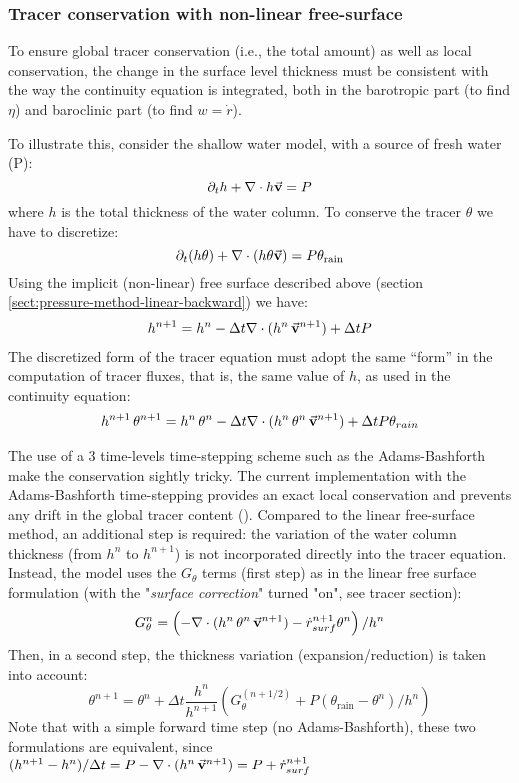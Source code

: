 \subsubsection{Tracer conservation with non-linear free-surface}
\label{sect:freesurf-tracer-advection}

To ensure global tracer conservation (i.e., the total amount) as well
as local conservation, the change in the surface level thickness must
be consistent with the way the continuity equation is integrated, both
in the barotropic part (to find $\eta$) and baroclinic part (to find
$w = \dot{r}$).

To illustrate this, consider the shallow water model, with a source
of fresh water (P):
$$
\partial_t h + \nabla \cdot h \vec{\bf v} = P
$$
where $h$ is the total thickness of the water column.
To conserve the tracer $\theta$ we have to discretize:
$$
\partial_t (h \theta) + \nabla \cdot ( h \theta \vec{\bf v})
  = P \theta_{\mathrm{rain}}
$$
Using the implicit (non-linear) free surface described above (section
\ref{sect:pressure-method-linear-backward}) we have:
\begin{eqnarray*}
h^{n+1} = h^{n} - \Delta t \nabla \cdot (h^n \, \vec{\bf v}^{n+1} ) + \Delta t P \\
\end{eqnarray*}
The discretized form of the tracer equation must adopt the same
``form'' in the computation of tracer fluxes, that is, the same value
of $h$, as used in the continuity equation:
\begin{eqnarray*}
h^{n+1} \, \theta^{n+1} = h^n \, \theta^n 
        - \Delta t \nabla \cdot (h^n \, \theta^n \, \vec{\bf v}^{n+1})
        + \Delta t P \theta_{rain}
\end{eqnarray*}

The use of a 3 time-levels time-stepping scheme such as the Adams-Bashforth
make the conservation sightly tricky.
The current implementation with the Adams-Bashforth time-stepping
provides an exact local conservation and prevents any drift in
the global tracer content (\cite{campin:02}).
Compared to the linear free-surface method, an additional step is required:
the variation of the water column thickness (from $h^n$ to $h^{n+1}$) is
not incorporated directly into the tracer equation.  Instead, the
model uses the $G_\theta$ terms (first step) as in the linear free
surface formulation (with the "{\it surface correction}" turned "on",
see tracer section):
$$
G_\theta^n = \left(- \nabla \cdot (h^n \, \theta^n \, \vec{\bf v}^{n+1}) 
         - \dot{r}_{surf}^{n+1} \theta^n \right) / h^n
$$
Then, in a second step, the thickness variation (expansion/reduction)
is taken into account:
$$
\theta^{n+1} = \theta^n + \Delta t \frac{h^n}{h^{n+1}} 
   \left( G_\theta^{(n+1/2)} + P (\theta_{\mathrm{rain}} - \theta^n )/h^n \right)
$$
Note that with a simple forward time step (no Adams-Bashforth), 
these two formulations are equivalent,  
since
$
(h^{n+1} - h^{n})/ \Delta t = 
P - \nabla \cdot (h^n \, \vec{\bf v}^{n+1} ) = P + \dot{r}_{surf}^{n+1}
$

